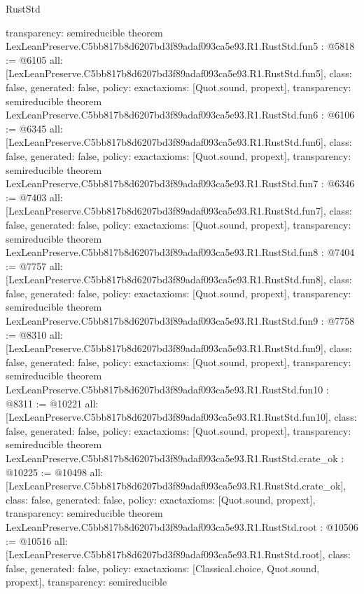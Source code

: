\begin{lexlean}{RustStd}
\begin{coremodule}
{  transparency: semireducible
}
theorem LexLeanPreserve.C5bb817b8d6207bd3f89adaf093ca5e93.R1.RustStd.fun5 : @5818 := @6105 {
  all: [LexLeanPreserve.C5bb817b8d6207bd3f89adaf093ca5e93.R1.RustStd.fun5],
  class: false,
  generated: false,
  policy: exact{axioms: [Quot.sound, propext]},
  transparency: semireducible
}
theorem LexLeanPreserve.C5bb817b8d6207bd3f89adaf093ca5e93.R1.RustStd.fun6 : @6106 := @6345 {
  all: [LexLeanPreserve.C5bb817b8d6207bd3f89adaf093ca5e93.R1.RustStd.fun6],
  class: false,
  generated: false,
  policy: exact{axioms: [Quot.sound, propext]},
  transparency: semireducible
}
theorem LexLeanPreserve.C5bb817b8d6207bd3f89adaf093ca5e93.R1.RustStd.fun7 : @6346 := @7403 {
  all: [LexLeanPreserve.C5bb817b8d6207bd3f89adaf093ca5e93.R1.RustStd.fun7],
  class: false,
  generated: false,
  policy: exact{axioms: [Quot.sound, propext]},
  transparency: semireducible
}
theorem LexLeanPreserve.C5bb817b8d6207bd3f89adaf093ca5e93.R1.RustStd.fun8 : @7404 := @7757 {
  all: [LexLeanPreserve.C5bb817b8d6207bd3f89adaf093ca5e93.R1.RustStd.fun8],
  class: false,
  generated: false,
  policy: exact{axioms: [Quot.sound, propext]},
  transparency: semireducible
}
theorem LexLeanPreserve.C5bb817b8d6207bd3f89adaf093ca5e93.R1.RustStd.fun9 : @7758 := @8310 {
  all: [LexLeanPreserve.C5bb817b8d6207bd3f89adaf093ca5e93.R1.RustStd.fun9],
  class: false,
  generated: false,
  policy: exact{axioms: [Quot.sound, propext]},
  transparency: semireducible
}
theorem LexLeanPreserve.C5bb817b8d6207bd3f89adaf093ca5e93.R1.RustStd.fun10 : @8311 := @10221 {
  all: [LexLeanPreserve.C5bb817b8d6207bd3f89adaf093ca5e93.R1.RustStd.fun10],
  class: false,
  generated: false,
  policy: exact{axioms: [Quot.sound, propext]},
  transparency: semireducible
}
theorem LexLeanPreserve.C5bb817b8d6207bd3f89adaf093ca5e93.R1.RustStd.crate_ok : @10225 := @10498 {
  all: [LexLeanPreserve.C5bb817b8d6207bd3f89adaf093ca5e93.R1.RustStd.crate_ok],
  class: false,
  generated: false,
  policy: exact{axioms: [Quot.sound, propext]},
  transparency: semireducible
}
theorem LexLeanPreserve.C5bb817b8d6207bd3f89adaf093ca5e93.R1.RustStd.root : @10506 := @10516 {
  all: [LexLeanPreserve.C5bb817b8d6207bd3f89adaf093ca5e93.R1.RustStd.root],
  class: false,
  generated: false,
  policy: exact{axioms: [Classical.choice, Quot.sound, propext]},
  transparency: semireducible
}


\end{coremodule}
\end{lexlean}
